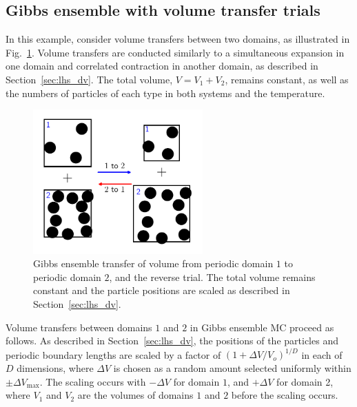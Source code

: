 \documentclass[
  9pt,
  bestpractices,
]{livecoms}
\begin{document}
\begin{figure}

\end{figure}

\subsection{\label{sec:lhs_gibbs_volume}Gibbs ensemble with volume transfer trials}

In this example, consider volume transfers between two domains, as illustrated in Fig.~\ref{fig:gibbs_volume}.
Volume transfers are conducted similarly to a simultaneous expansion in one domain and correlated contraction in another domain, as described in Section~\ref{sec:lhs_dv}.
The total volume, $V=V_1+V_2$, remains constant, as well as the numbers of particles of each type in both systems and the temperature.

\begin{figure}
\begin{centering}
\includegraphics[width=6.5cm]{../figures/gibbs_volume.pdf}
\caption{
Gibbs ensemble transfer of volume from periodic domain $1$ to periodic domain $2$, and the reverse trial.
The total volume remains constant and the particle positions are scaled as described in Section~\ref{sec:lhs_dv}.
}
\label{fig:gibbs_volume}
\end{centering}
\end{figure}

Volume transfers between domains $1$ and $2$ in Gibbs ensemble MC proceed as follows.
As described in Section~\ref{sec:lhs_dv}, the positions of the particles and periodic boundary lengths are scaled by a factor of $(1+\Delta V/V_o)^{1/D}$ in each of $D$ dimensions, where $\Delta V$ is chosen as a random amount selected uniformly within $\pm\Delta V_{\mathrm{max}}$.
The scaling occurs with $-\Delta V$ for domain $1$, and $+\Delta V$ for domain 2, where $V_1$ and $V_2$ are the volumes of domains $1$ and $2$ before the scaling occurs.
\end{document}
